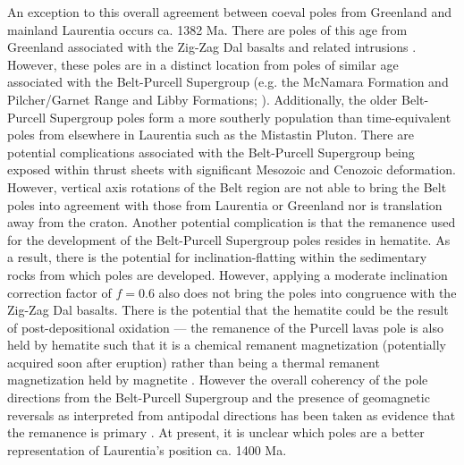 \documentclass[twocolumn, switch]{article} %
\begin{document}
An exception to this overall agreement between coeval poles from Greenland and mainland Laurentia occurs ca. 1382 Ma. There are poles of this age from Greenland associated with the Zig-Zag Dal basalts and related intrusions \citep{Marcussen1983a, Abrahamsen1987a}. However, these poles are in a distinct location from poles of similar age associated with the Belt-Purcell Supergroup (e.g. the McNamara Formation and Pilcher/Garnet Range and Libby Formations; \citealp{Elston2002a}). Additionally, the older Belt-Purcell Supergroup poles form a more southerly population than time-equivalent poles from elsewhere in Laurentia such as the Mistastin Pluton. There are potential complications associated with the Belt-Purcell Supergroup being exposed within thrust sheets with significant Mesozoic and Cenozoic deformation. However, vertical axis rotations of the Belt region are not able to bring the Belt poles into agreement with those from Laurentia or Greenland nor is translation away from the craton. Another potential complication is that the remanence used for the development of the Belt-Purcell Supergroup poles resides in hematite. As a result, there is the potential for inclination-flatting within the sedimentary rocks from which poles are developed. However, applying a moderate inclination correction factor of $f=0.6$ also does not bring the poles into congruence with the Zig-Zag Dal basalts. There is the potential that the hematite could be the result of post-depositional oxidation --- the remanence of the Purcell lavas pole is also held by hematite such that it is a chemical remanent magnetization (potentially acquired soon after eruption) rather than being a thermal remanent magnetization held by magnetite \citep{Elston2002a}. However the overall coherency of the pole directions from the Belt-Purcell Supergroup and the presence of geomagnetic reversals as interpreted from antipodal directions has been taken as evidence that the remanence is primary \citep{Elston2002a}. At present, it is unclear which poles are a better representation of Laurentia's position ca. 1400 Ma.
\end{document}
